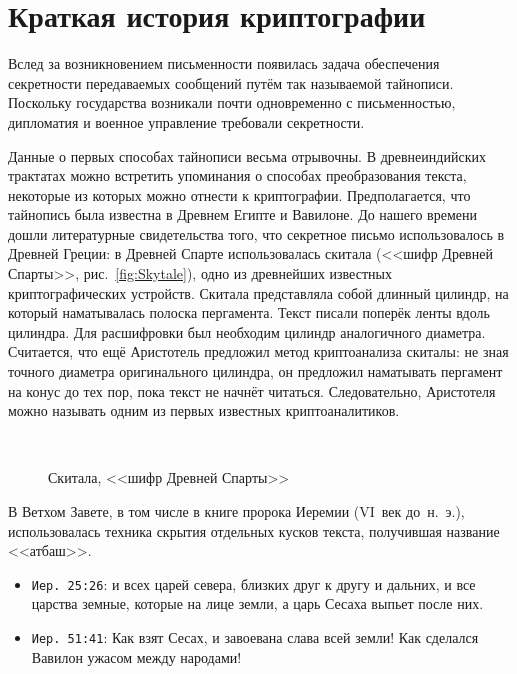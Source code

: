 \chapter{Краткая история криптографии}

Вслед за возникновением письменности появилась задача обеспечения секретности передаваемых сообщений путём так называемой тайнописи. Поскольку государства возникали почти одновременно с письменностью, дипломатия и военное управление требовали секретности.

Данные о первых способах тайнописи весьма отрывочны. В древнеиндийских трактатах можно встретить упоминания о способах преобразования текста, некоторые из которых можно отнести к криптографии. Предполагается, что тайнопись была известна в Древнем Египте и Вавилоне. До нашего времени дошли литературные свидетельства того, что секретное письмо использовалось в Древней Греции: в Древней Спарте использовалась скитала (<<шифр Древней Спарты>>, рис.~\ref{fig:Skytale}), одно из древнейших известных криптографических устройств. Скитала представляла собой длинный цилиндр, на который наматывалась полоска пергамента. Текст писали поперёк ленты вдоль цилиндра. Для расшифровки был необходим цилиндр аналогичного диаметра. Считается, что ещё Аристотель предложил метод криптоанализа скиталы: не зная точного диаметра оригинального цилиндра, он предложил наматывать пергамент на конус до тех пор, пока текст не начнёт читаться. Следовательно, Аристотеля можно называть одним из первых известных криптоаналитиков.

\begin{figure}[t]
	\centering
	~~
	\caption{Скитала, <<шифр Древней Спарты>>}
\end{figure}

В Ветхом Завете, в том числе в книге пророка Иеремии (VI~век до~н.~э.), использовалась техника скрытия отдельных кусков текста, получившая название <<атбаш>>.

\begin{itemize}
	\item \texttt{Иер. 25:26}: и всех царей севера, близких друг к другу и дальних, и все царства земные, которые на лице земли, а царь Сесаха выпьет после них.
	\item \texttt{Иер. 51:41}: Как взят Сесах, и завоевана слава всей земли! Как сделался Вавилон ужасом между народами!
\end{itemize}

